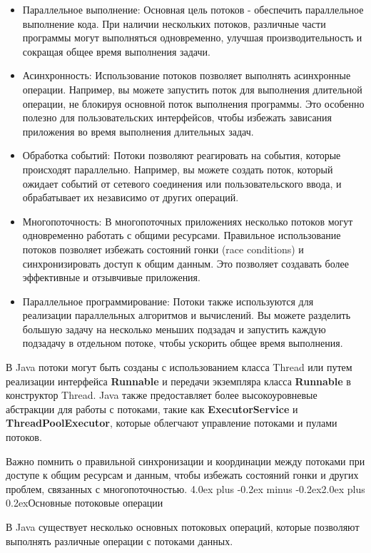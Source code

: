\documentclass[12pt, a4paper]{book}%
\makeatletter
\renewcommand{\section}{\@startsection{section}{1}{1pt}%
{4.0ex plus -0.2ex minus -0.2ex}{2.0ex plus 0.2ex}{\centering\bf}}%
\makeatother
\begin{document}
{\begin{itemize} 
\item Параллельное выполнение: Основная цель потоков - обеспечить параллельное выполнение кода. При наличии нескольких потоков, различные части программы могут выполняться одновременно, улучшая производительность и сокращая общее время выполнения задачи.
\item Асинхронность: Использование потоков позволяет выполнять асинхронные операции. Например, вы можете запустить поток для выполнения длительной операции, не блокируя основной поток выполнения программы. Это особенно полезно для пользовательских интерфейсов, чтобы избежать зависания приложения во время выполнения длительных задач.
\item Обработка событий: Потоки позволяют реагировать на события, которые происходят параллельно. Например, вы можете создать поток, который ожидает событий от сетевого соединения или пользовательского ввода, и обрабатывает их независимо от других операций.
\item Многопоточность: В многопоточных приложениях несколько потоков могут одновременно работать с общими ресурсами. Правильное использование потоков позволяет избежать состояний гонки (race conditions) и синхронизировать доступ к общим данным. Это позволяет создавать более эффективные и отзывчивые приложения.
\item Параллельное программирование: Потоки также используются для реализации параллельных алгоритмов и вычислений. Вы можете разделить большую задачу на несколько меньших подзадач и запустить каждую подзадачу в отдельном потоке, чтобы ускорить общее время выполнения.
\end{itemize}
В Java потоки могут быть созданы с использованием класса Thread или путем реализации интерфейса {\bf Runnable} и передачи экземпляра класса {\bf Runnable} в конструктор Thread. Java также предоставляет более высокоуровневые абстракции для работы с потоками, такие как {\bf ExecutorService} и {\bf ThreadPoolExecutor}, которые облегчают управление потоками и пулами потоков.

Важно помнить о правильной синхронизации и координации между потоками при доступе к общим ресурсам и данным, чтобы избежать состояний гонки и других проблем, связанных с многопоточностью.
\section{Основные потоковые операции}

В Java существует несколько основных потоковых операций, которые позволяют выполнять различные операции с потоками данных. 

}
\end{document}

